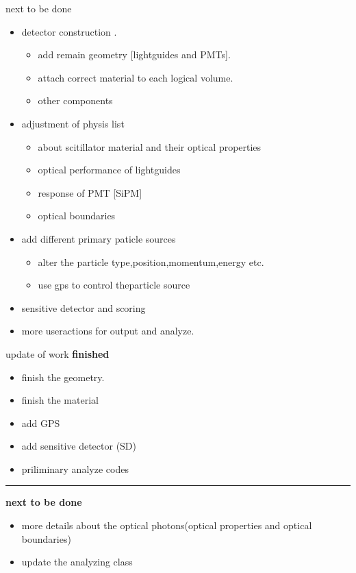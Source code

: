 \documentclass[11pt,compress,xcolor=x11names,UTF8]{beamer}
\begin{document}
\begin{frame}{next to be done}
\begin{itemize}
\item detector construction \alert{.}
\begin{itemize}
\item add remain geometry [lightguides and PMTs].
\item attach correct material to each logical volume.
\item other components
\end{itemize}
\item adjustment of physis list
\begin{itemize}
\item  about scitillator material and their \alert{optical properties}
\item  optical performance of lightguides
\item  response of PMT [SiPM]
\item optical boundaries
\end{itemize}

\item add different primary \alert{paticle sources}\\
\begin{itemize}
\item alter the particle type,position,momentum,energy etc.\\
\item  use gps to control theparticle source
\end{itemize}
\item sensitive detector and scoring
\item more useractions for output and analyze.
\end{itemize}
\end{frame}
\begin{frame}{ update of work}
	\textbf{finished}
	\begin{itemize}
		\item finish the geometry.
\item finish the material
		\item add GPS
\item add sensitive detector (SD)
\item priliminary analyze codes
	\end{itemize}
	\hrule{\textwidth}
	\vspace{.8cm}
	\textbf{next to be done}
	\begin{itemize}
		\item more details about the optical photons(optical properties and optical boundaries)
		\item update the analyzing class
	\end{itemize}
\end{frame}
\end{document}
